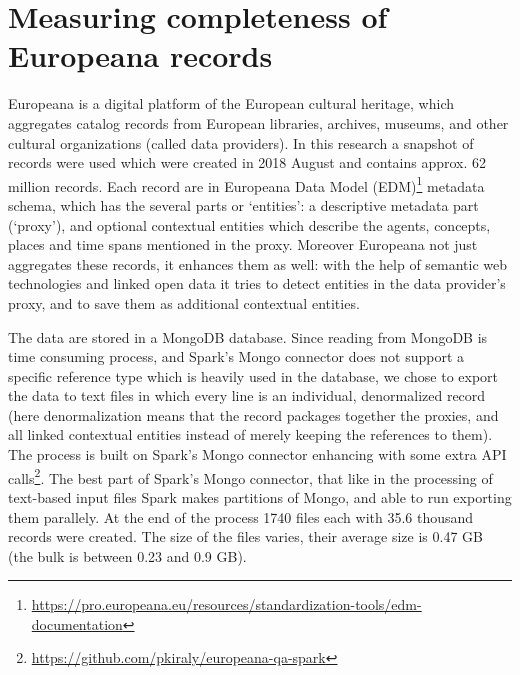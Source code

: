 \section{Measuring completeness of Europeana records}
Europeana is a digital platform of the European cultural heritage, which aggregates catalog records from European libraries, archives, museums, and other cultural organizations (called data providers). In this research a snapshot of records were used which were created in 2018 August and contains approx. 62 million records. Each record are in Europeana Data Model (EDM)\footnote{\url{https://pro.europeana.eu/resources/standardization-tools/edm-documentation}} metadata schema, which has the several parts or `entities': a descriptive metadata part (`proxy'), and optional contextual entities which describe the agents, concepts, places and time spans mentioned in the proxy. Moreover Europeana not just aggregates these records, it enhances them as well: with the help of semantic web technologies and linked open data it tries to detect entities in the data provider's proxy, and to save them as additional contextual entities.

The data are stored in a MongoDB database. Since reading from MongoDB is time consuming process, and Spark's Mongo connector does not support a specific reference type which is heavily used in the database, we chose to export the data to text files in which every line is an individual, denormalized record (here denormalization means that the record packages together the proxies, and all linked contextual entities instead of merely keeping the references to them). The process is built on Spark's Mongo connector enhancing with some extra API calls\footnote{\url{https://github.com/pkiraly/europeana-qa-spark}}. The best part of Spark's Mongo connector, that like in the processing of text-based input files Spark makes partitions of Mongo, and able to run exporting them parallely. At the end of the process 1740 files each with 35.6 thousand records were created. The size of the files varies, their average size is 0.47 GB (the bulk is between 0.23 and 0.9 GB).

